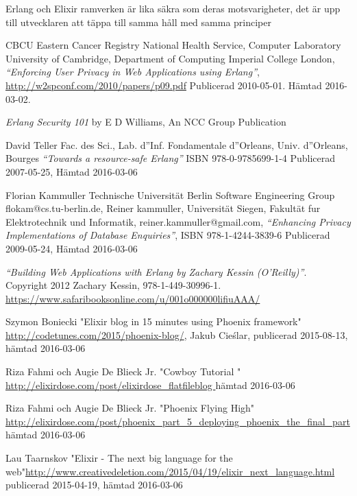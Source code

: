 \documentclass[12pt]{article}
\begin{document}
Erlang och Elixir ramverken är lika säkra som deras motsvarigheter, det är upp till utvecklaren att täppa till samma håll med samma principer\cite{exploit}
	
  
\begin{thebibliography}{99}

	
 CBCU Eastern Cancer Registry National Health Service, Computer Laboratory University of Cambridge, Department of Computing Imperial College London, {\em “Enforcing User Privacy in Web Applications using Erlang”}, \url{http://w2spconf.com/2010/papers/p09.pdf} Publicerad 2010-05-01. Hämtad 2016-03-02.

 {\em Erlang Security 101} by E D Williams, An NCC Group Publication

David Teller Fac. des Sci., Lab. d''Inf. Fondamentale d''Orleans, Univ. d''Orleans, Bourges {\em “Towards a resource-safe Erlang”} ISBN 978-0-9785699-1-4
Publicerad 2007-05-25, Hämtad 2016-03-06			
					
Florian Kammuller Technische Universität Berlin Software Engineering Group flokam@cs.tu-berlin.de, Reiner kammuller, Universität Siegen, Fakultät fur Elektrotechnik und Informatik, reiner.kammuller@gmail.com, {\em “Enhancing Privacy Implementations of Database Enquiries”}, ISBN 978-1-4244-3839-6
Publicerad 2009-05-24, Hämtad 2016-03-06


 {\em “Building Web Applications with Erlang by Zachary Kessin (O’Reilly)”}. Copyright 2012 Zachary Kessin, 978-1-449-30996-1.
\url{https://www.safaribooksonline.com/u/001o000000lifiuAAA/}

 Szymon Boniecki "Elixir blog in 15 minutes using Phoenix framework" \url{http://codetunes.com/2015/phoenix-blog/}, Jakub Cieślar, publicerad 2015-08-13,
hämtad 2016-03-06

Riza Fahmi och Augie De Blieck Jr. "Cowboy Tutorial " \url{http://elixirdose.com/post/elixirdose_flatfileblog }
hämtad 2016-03-06

Riza Fahmi och Augie De Blieck Jr.  "Phoenix Flying High" \url{http://elixirdose.com/post/phoenix_part_5_deploying_phoenix_the_final_part} 
hämtad 2016-03-06

 Lau Taarnskov "Elixir - The next big language for the web"\url{http://www.creativedeletion.com/2015/04/19/elixir_next_language.html}
publicerad  2015-04-19,
hämtad 2016-03-06


\end{thebibliography}
\end{document}
